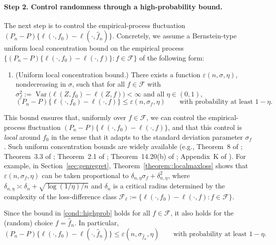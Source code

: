 \documentclass[11pt]{article}
\theoremstyle{plain}
\theoremstyle{definition} %
\newcommand{\Var}{\operatorname{Var}}
\begin{document}
\noindent \paragraph{Step 2. Control randomness through a high-probability bound.}
The next step is to control the empirical-process fluctuation
\((P_n-P)\bigl\{\ell(\cdot,f_0)-\ell(\cdot,\hat f_n)\bigr\}\).
Concretely, we assume a Bernstein-type uniform local concentration bound on the empirical process
\(\{(P_n-P)\{\ell(\cdot,f_0)-\ell(\cdot,f)\} : f \in \mathcal F\}\) of the following form:
\begin{enumerate}[label=\bfseries E\arabic*), ref={E\arabic*}, series=ex]
  \item \label{cond::highprob} (Uniform local concentration bound.)
  There exists a function \(\varepsilon(n,\sigma,\eta)\), nondecreasing in
  \(\sigma\), such that for all \(f\in\mathcal F\) with
  \(\sigma_f^2:=\Var\bigl(\ell(Z,f_0)-\ell(Z,f)\bigr)<\infty\) and all
  \(\eta\in(0,1)\),
  \[
  (P_n-P)\{\ell(\cdot,f_0)-\ell(\cdot,f)\}\le \varepsilon(n,\sigma_f,\eta)
  \qquad\text{with probability at least }1-\eta.
  \]
\end{enumerate}
This bound ensures that, uniformly over \(f\in\mathcal F\), we can control the empirical-process fluctuation
\((P_n-P)\{\ell(\cdot,f_0)-\ell(\cdot,f)\}\),
and that this control is \emph{local} around \(f_0\) in the sense that it adapts to the standard deviation parameter \(\sigma_f\).
Such uniform concentration bounds are widely available (e.g., Theorem~8 of \citealp{bousquet2003introduction}; Theorem~3.3 of
\citealp{bartlett2005local}; Theorem~2.1 of \citealp{gine2006concentration};
Theorem~14.20(b) of \citealp{wainwright2019high}; Appendix~K of
\citealp{foster2023orthogonal}).
For example, in Section~\ref{sec:genregret}, Theorem~\ref{theorem::localmaxloss} shows that \(\varepsilon(n,\sigma_f,\eta)\)
can be taken proportional to \(\delta_{n,\eta}\sigma_f+\delta_{n,\eta}^2\),
where \(\delta_{n,\eta}\asymp \delta_n+\sqrt{\log(1/\eta)/n}\) and \(\delta_n\)
is a critical radius determined by the complexity of the loss-difference class
\(\mathcal F_\ell:=\{\ell(\cdot,f_0)-\ell(\cdot,f): f\in\mathcal F\}\).

Since the bound in \ref{cond::highprob} holds for all \(f\in\mathcal F\), it also holds for the (random) choice \(f=\hat f_n\).
In particular,
\begin{equation}
\label{eqn::highprobboundgeneric}
(P_n-P)\bigl\{\ell(\cdot,f_0)-\ell(\cdot,\hat f_n)\bigr\}
\le \varepsilon (n,\sigma_{\hat f_n},\eta)
\qquad\text{with probability at least }1-\eta.
\end{equation}
\end{document}
